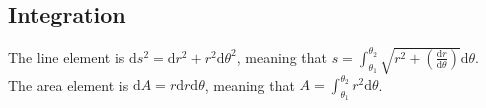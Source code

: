 \subsection{Integration}
\noindent
The line element is $\mathrm{d}s^2 = \mathrm{d}r^2 + r^2\mathrm{d}\theta^2$, meaning that $s = \int_{\theta_1}^{\theta_2}{\sqrt{r^2 + \left(\frac{\mathrm{d}r}{\mathrm{d}\theta}\right)}\mathrm{d}\theta}$.\\
The area element is $\mathrm{d}A = r\mathrm{d}r\mathrm{d}\theta$, meaning that $A = \int_{\theta_1}^{\theta_2}{r^2\mathrm{d}\theta}$.

